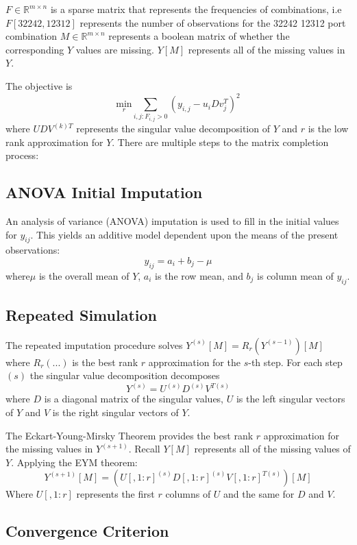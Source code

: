 \documentclass[12pt,twoside]{dukestatscithesis}
\theoremstyle{definition}
\theoremstyle{definition}
\theoremstyle{definition}
\theoremstyle{remark}
\begin{document}
\(F \in \mathbb{R}^{m \times n}\) is a sparse matrix that represents the
frequencies of combinations, i.e \(F[32242,12312]\) represents the
number of observations for the 32242 12312 port combination
\(M \in \mathbb{R}^{m \times n}\) represents a boolean matrix of whether
the corresponding \(Y\) values are missing. \(Y[M]\) represents all of
the missing values in \(Y\).

The objective is
\[\underset{r}{\text{min}} \sum_{i,j:F_{i,j} > 0} (y_{i,j} - u_iDv^T_j)^2\]
where \(UDV^{(k)T}\) represents the singular value decomposition of
\(Y\) and \(r\) is the low rank approximation for \(Y\). There are
multiple steps to the matrix completion process:

\subsection{ANOVA Initial Imputation}\label{anova-initial-imputation}

An analysis of variance (ANOVA) imputation is used to fill in the
initial values for \(y_{ij}\). This yields an additive model dependent
upon the means of the present observations:
\[y_{ij} =  a_i + b_j - \mu\] where\(\mu\) is the overall mean of \(Y\),
\(a_i\) is the row mean, and \(b_j\) is column mean of \(y_{ij}\).

\subsection{Repeated Simulation}\label{repeated-simulation}

The repeated imputation procedure solves
\(Y^{(s)}[M] = R_r(Y^{(s-1)})[M]\) where \(R_r( ... )\) is the best rank
\(r\) approximation for the \(s\)-th step. For each step \((s)\) the
singular value decomposition decomposes
\[Y^{(s)} =  U^{(s)}D^{(s)}V^{T(s)}\] where \(D\) is a diagonal matrix
of the singular values, \(U\) is the left singular vectors of \(Y\) and
\(V\) is the right singular vectors of \(Y\).

The Eckart-Young-Mirsky Theorem provides the best rank \(r\)
approximation for the missing values in \(Y^{(s+1)}\). Recall \(Y[M]\)
represents all of the missing values of \(Y\). Applying the EYM theorem:
\[Y^{(s+1)}[M] = (U[,1:r]^{(s)}D[,1:r]^{(s)}V[,1:r]^{T(s)})[M]\] Where
\(U[,1:r]\) represents the first \(r\) columns of \(U\) and the same for
\(D\) and \(V\).

\subsection{Convergence Criterion}\label{convergence-criterion}
\end{document}
